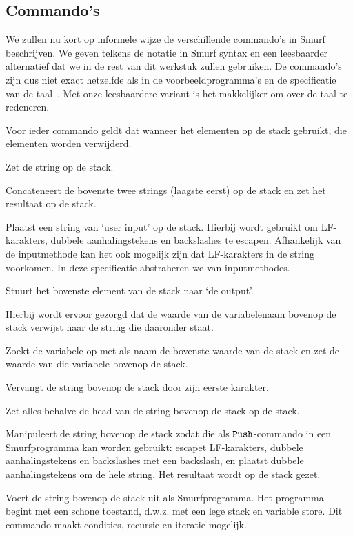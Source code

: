 \subsection{Commando's}
\label{sec:intro:commands}
We zullen nu kort op informele wijze de verschillende commando's in Smurf
beschrijven. We geven telkens de notatie in Smurf syntax en een leesbaarder
alternatief dat we in de rest van dit werkstuk zullen gebruiken. De commando's
zijn dus niet exact hetzelfde als in de voorbeeldprogramma's en de specificatie
van de taal~\cite{safalra}. Met onze leesbaardere variant is het makkelijker om
over de taal te redeneren.

Voor ieder commando geldt dat wanneer het elementen op de stack gebruikt, die
elementen worden verwijderd.

\begin{description}[style=nextline,font=\normalfont]
	\item[\smurfinline{"..."} of $\StmPush~\texttt{...}$, waar \lit{...} een
		string is]
		Zet de string  op de stack.
	\item[\smurfinline{+} of $\StmCat$]
		Concateneert de bovenste twee strings (laagste eerst) op de stack en zet
		het resultaat op de stack.
	\item[\smurfinline{i} of $\StmInput$]
		Plaatst een string van `user input' op de stack. Hierbij wordt
		\lit{\textbackslash} gebruikt om LF-karakters, dubbele aanhalingstekens en
		backslashes te escapen. Afhankelijk van de inputmethode kan het ook
		mogelijk zijn dat LF-karakters in de string voorkomen. In deze specificatie
		abstraheren we van inputmethodes.
	\item[\smurfinline{o} of $\StmOutput$]
		Stuurt het bovenste element van de stack naar `de output'.
	\item[\smurfinline{p} of $\StmPut$]
		Hierbij wordt ervoor gezorgd dat de waarde van de variabelenaam bovenop de
		stack verwijst naar de string die daaronder staat.
	\item[\smurfinline{g} of $\StmGet$]
		Zoekt de variabele op met als naam de bovenste waarde van de stack en zet
		de waarde van die variabele bovenop de stack.
	\item[\smurfinline{h} of $\StmHead$]
		Vervangt de string bovenop de stack door zijn eerste karakter.
	\item[\smurfinline{t} of $\StmTail$]
		Zet alles behalve de head van de string bovenop de stack op de stack.
	\item[\smurfinline{q} of $\StmQuotify$]
		Manipuleert de string bovenop de stack zodat die als $\texttt{Push}$-commando in
		een Smurfprogramma kan worden gebruikt: escapet LF-karakters, dubbele
		aanhalingstekens en back\-slashes met een backslash, en plaatst dubbele
		aanhalingstekens om de hele string. Het resultaat wordt op de stack gezet.
	\item[\smurfinline{x} of $\StmExec$]
		Voert de string bovenop de stack uit als Smurfprogramma. Het programma
		begint met een schone toestand, d.w.z. met een lege stack en variable
		store. Dit commando maakt condities, recursie en iteratie mogelijk.
\end{description}

